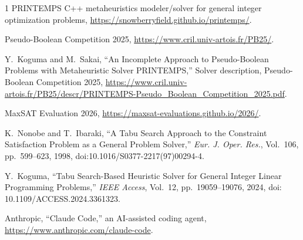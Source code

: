 \documentclass[conference]{IEEEtran}
\begin{document}
\begin{thebibliography}{1}
PRINTEMPS C++ metaheuristics modeler/solver for general integer optimization problems, \url{https://snowberryfield.github.io/printemps/}.

Pseudo-Boolean Competition 2025, \url{https://www.cril.univ-artois.fr/PB25/}.

Y.~Koguma and M.~Sakai, ``An Incomplete Approach to Pseudo-Boolean Problems with Metaheuristic Solver PRINTEMPS,'' Solver description, Pseudo-Boolean Competition 2025, \url{https://www.cril.univ-artois.fr/PB25/descr/PRINTEMPS-Pseudo_Boolean_Competition_2025.pdf}.

MaxSAT Evaluation 2026, \url{https://maxsat-evaluations.github.io/2026/}.

K.~Nonobe and T.~Ibaraki, ``A Tabu Search Approach to the Constraint Satisfaction Problem as a General Problem Solver,'' \emph{Eur. J. Oper. Res.}, Vol.~106, pp.~599--623, 1998, doi:10.1016/S0377-2217(97)00294-4.

Y.~Koguma, ``Tabu Search-Based Heuristic Solver for General Integer Linear Programming Problems,'' {\em IEEE Access}, Vol.~12, pp.~19059--19076, 2024, doi: 10.1109/ACCESS.2024.3361323.

Anthropic, ``Claude Code,'' an AI-assisted coding agent, \url{https://www.anthropic.com/claude-code}.

\end{thebibliography}
\end{document}

